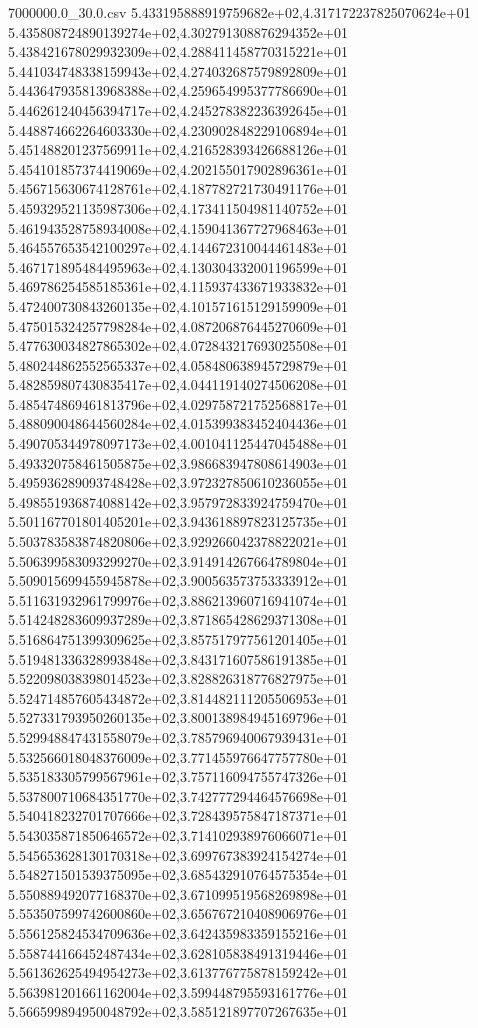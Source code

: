 \begin{filecontents*}{7000000.0_30.0.csv}
5.433195888919759682e+02,4.317172237825070624e+01
5.435808724890139274e+02,4.302791308876294352e+01
5.438421678029932309e+02,4.288411458770315221e+01
5.441034748338159943e+02,4.274032687579892809e+01
5.443647935813968388e+02,4.259654995377786690e+01
5.446261240456394717e+02,4.245278382236392645e+01
5.448874662264603330e+02,4.230902848229106894e+01
5.451488201237569911e+02,4.216528393426688126e+01
5.454101857374419069e+02,4.202155017902896361e+01
5.456715630674128761e+02,4.187782721730491176e+01
5.459329521135987306e+02,4.173411504981140752e+01
5.461943528758934008e+02,4.159041367727968463e+01
5.464557653542100297e+02,4.144672310044461483e+01
5.467171895484495963e+02,4.130304332001196599e+01
5.469786254585185361e+02,4.115937433671933832e+01
5.472400730843260135e+02,4.101571615129159909e+01
5.475015324257798284e+02,4.087206876445270609e+01
5.477630034827865302e+02,4.072843217693025508e+01
5.480244862552565337e+02,4.058480638945729879e+01
5.482859807430835417e+02,4.044119140274506208e+01
5.485474869461813796e+02,4.029758721752568817e+01
5.488090048644560284e+02,4.015399383452404436e+01
5.490705344978097173e+02,4.001041125447045488e+01
5.493320758461505875e+02,3.986683947808614903e+01
5.495936289093748428e+02,3.972327850610236055e+01
5.498551936874088142e+02,3.957972833924759470e+01
5.501167701801405201e+02,3.943618897823125735e+01
5.503783583874820806e+02,3.929266042378822021e+01
5.506399583093299270e+02,3.914914267664789804e+01
5.509015699455945878e+02,3.900563573753333912e+01
5.511631932961799976e+02,3.886213960716941074e+01
5.514248283609937289e+02,3.871865428629371308e+01
5.516864751399309625e+02,3.857517977561201405e+01
5.519481336328993848e+02,3.843171607586191385e+01
5.522098038398014523e+02,3.828826318776827975e+01
5.524714857605434872e+02,3.814482111205506953e+01
5.527331793950260135e+02,3.800138984945169796e+01
5.529948847431558079e+02,3.785796940067939431e+01
5.532566018048376009e+02,3.771455976647757780e+01
5.535183305799567961e+02,3.757116094755747326e+01
5.537800710684351770e+02,3.742777294464576698e+01
5.540418232701707666e+02,3.728439575847187371e+01
5.543035871850646572e+02,3.714102938976066071e+01
5.545653628130170318e+02,3.699767383924154274e+01
5.548271501539375095e+02,3.685432910764575354e+01
5.550889492077168370e+02,3.671099519568269898e+01
5.553507599742600860e+02,3.656767210408906976e+01
5.556125824534709636e+02,3.642435983359155216e+01
5.558744166452487434e+02,3.628105838491319446e+01
5.561362625494954273e+02,3.613776775878159242e+01
5.563981201661162004e+02,3.599448795593161776e+01
5.566599894950048792e+02,3.585121897707267635e+01

\end{filecontents*}
